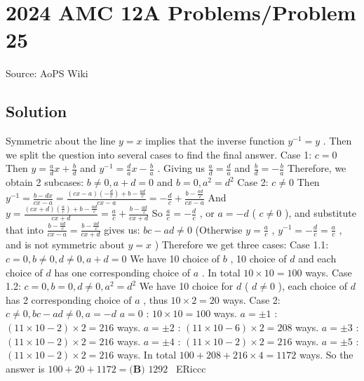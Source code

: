 \documentclass[12pt]{article}
\begin{document}
\section*{{2024 AMC 12A Problems/Problem 25}}
Source: AoPS Wiki

\subsection*{Solution}
Symmetric about the line $y=x$ implies that the inverse function $y^{-1}=y$ . Then we split the question into several cases to find the final answer. Case 1: $c=0$ Then $y=\frac{a}{d}x+\frac{b}{d}$ and $y^{-1}=\frac{d}{a}x-\frac{b}{a}$ .
Giving us $\frac{a}{d}=\frac{d}{a}$ and $\frac{b}{d}=-\frac{b}{a}$ Therefore, we obtain 2 subcases: $b\neq 0, a+d=0$ and $b=0, a^2=d^2$ Case 2: $c\neq 0$ Then $y^{-1}=\frac{b-dx}{cx-a}=\frac{(cx-a)(-\frac{d}{c})+b-\frac{ad}{c}}{cx-a}=-\frac{d}{c}+\frac{b-\frac{ad}{c}}{cx-a}$ And $y=\frac{(cx+d)(\frac{a}{c})+b-\frac{ad}{c}}{cx+d}=\frac{a}{c}+\frac{b-\frac{ad}{c}}{cx+d}$ So $\frac{a}{c}=-\frac{d}{c}$ , or $a=-d$ ( $c\neq 0$ ), and substitute that into $\frac{b-\frac{ad}{c}}{cx-a}=\frac{b-\frac{ad}{c}}{cx+d}$ gives us: $bc-ad\neq 0$ (Otherwise $y=\frac{a}{c}$ , $y^{-1}=-\frac{d}{c}=\frac{a}{c}$ , and is not symmetric about $y=x$ ) Therefore we get three cases: Case 1.1: $c= 0, b\neq 0, d\neq 0, a+d=0$ We have 10 choice of $b$ , 10 choice of $d$ and each choice of $d$ has one corresponding choice of $a$ . In total $10\times 10=100$ ways. Case 1.2: $c= 0, b = 0, d\neq 0, a^2=d^2$ We have 10 choice for $d$ ( $d\neq 0$ ), each choice of $d$ has 2 corresponding choice of $a$ , thus $10\times 2=20$ ways. Case 2: $c\neq 0, bc-ad\neq 0, a=-d$ $a=0$ : $10\times 10=100$ ways. $a=\pm 1$ : $(11\times 10-2)\times 2=216$ ways. $a=\pm 2$ : $(11\times 10-6)\times 2=208$ ways. $a=\pm 3$ : $(11\times 10-2)\times 2=216$ ways. $a=\pm 4$ : $(11\times 10-2)\times 2=216$ ways. $a=\pm 5$ : $(11\times 10-2)\times 2=216$ ways. In total $100+208+216\times 4= 1172$ ways. So the answer is $100+20+1172= \boxed{\textbf{(B) }1292}$ ~ERiccc
\end{document}
